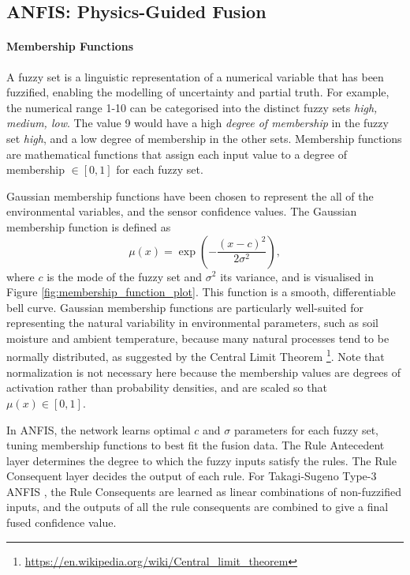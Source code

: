     
\subsection{ANFIS: Physics-Guided Fusion} \label{ANFIS}

    \paragraph{Membership Functions}

        A fuzzy set is a linguistic representation of a numerical variable that has been fuzzified, enabling the modelling of uncertainty and partial truth. For example, the numerical range 1-10 can be categorised into the distinct fuzzy sets \textit{high, medium, low}. The value 9 would have a high \textit{degree of membership} in the fuzzy set \textit{high}, and a low degree of membership in the other sets. Membership functions are mathematical functions that assign each input value to a degree of membership \(\in [0,1]\) for each fuzzy set. 
        
        Gaussian membership functions have been chosen to represent the all of the environmental variables, and the sensor confidence values. The Gaussian membership function is defined as
        \begin{equation}
        \label{eq:gaussian_mf}
        \mu(x) = \exp\left( -\frac{(x - c)^2}{2\sigma^2} \right),
        \end{equation}
        where \( c \) is the mode of the fuzzy set and \( \sigma^2 \) its variance, and is visualised in Figure \ref{fig:membership_function_plot}. This function is a smooth, differentiable bell curve.
        Gaussian membership functions are particularly well-suited for representing the natural variability in environmental parameters, such as soil moisture and ambient temperature, because many natural processes tend to be normally distributed, as suggested by the Central Limit Theorem \footnote{\url{https://en.wikipedia.org/wiki/Central_limit_theorem}}. Note that normalization is not necessary here because the membership values are degrees of activation rather than probability densities, and are scaled so that \(\mu(x)\in [0,1]\).
        
        In ANFIS, the network learns optimal \(c\) and \(\sigma\) parameters for each fuzzy set, tuning membership functions to best fit the fusion data. The Rule Antecedent layer determines the degree to which the fuzzy inputs satisfy the rules. The Rule Consequent layer decides the output of each rule. For Takagi-Sugeno Type-3 ANFIS \cite{jang1993anfis}, the Rule Consequents are learned as linear combinations of non-fuzzified inputs, and the outputs of all the rule consequents are combined to give a final fused confidence value. 

